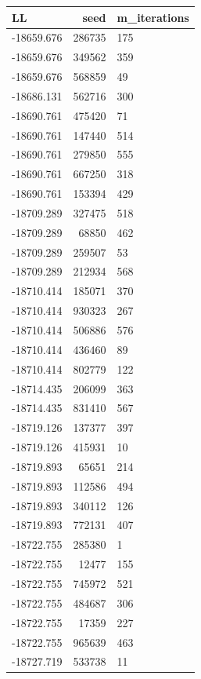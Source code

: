 \documentclass[]{book}
\theoremstyle{definition}
\theoremstyle{definition}
\theoremstyle{definition}
\theoremstyle{remark}
\begin{document}
\begin{tabular}{l|r|l}
\hline
LL & seed & m\_iterations\\
\hline
-18659.676 & 286735 & 175\\
\hline
-18659.676 & 349562 & 359\\
\hline
-18659.676 & 568859 & 49\\
\hline
-18686.131 & 562716 & 300\\
\hline
-18690.761 & 475420 & 71\\
\hline
-18690.761 & 147440 & 514\\
\hline
-18690.761 & 279850 & 555\\
\hline
-18690.761 & 667250 & 318\\
\hline
-18690.761 & 153394 & 429\\
\hline
-18709.289 & 327475 & 518\\
\hline
-18709.289 & 68850 & 462\\
\hline
-18709.289 & 259507 & 53\\
\hline
-18709.289 & 212934 & 568\\
\hline
-18710.414 & 185071 & 370\\
\hline
-18710.414 & 930323 & 267\\
\hline
-18710.414 & 506886 & 576\\
\hline
-18710.414 & 436460 & 89\\
\hline
-18710.414 & 802779 & 122\\
\hline
-18714.435 & 206099 & 363\\
\hline
-18714.435 & 831410 & 567\\
\hline
-18719.126 & 137377 & 397\\
\hline
-18719.126 & 415931 & 10\\
\hline
-18719.893 & 65651 & 214\\
\hline
-18719.893 & 112586 & 494\\
\hline
-18719.893 & 340112 & 126\\
\hline
-18719.893 & 772131 & 407\\
\hline
-18722.755 & 285380 & 1\\
\hline
-18722.755 & 12477 & 155\\
\hline
-18722.755 & 745972 & 521\\
\hline
-18722.755 & 484687 & 306\\
\hline
-18722.755 & 17359 & 227\\
\hline
-18722.755 & 965639 & 463\\
\hline
-18727.719 & 533738 & 11\\

\end{tabular}
\end{document}
